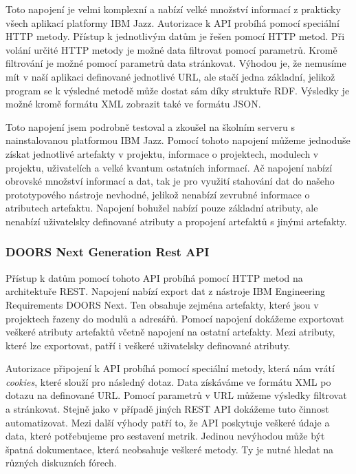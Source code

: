 \documentclass[czech,master,public,dept460,male,cpdeclaration,oneside]{diploma}
\begin{document}
Toto napojení je velmi komplexní a nabízí velké množství informací z prakticky všech aplikací platformy IBM Jazz. Autorizace k API probíhá pomocí speciální HTTP metody. Přístup k jednotlivým datům je řešen pomocí HTTP metod. Při volání určité HTTP metody je možné data filtrovat pomocí parametrů. Kromě filtrování je možné pomocí parametrů data stránkovat. Výhodou je, že nemusíme mít v naší aplikaci definované jednotlivé URL, ale stačí jedna základní, jelikož program se k výsledné metodě může dostat sám díky struktuře RDF. Výsledky je možné kromě formátu XML zobrazit také ve formátu JSON.

Toto napojení jsem podrobně testoval a zkoušel na školním serveru s nainstalovanou platformou IBM Jazz. Pomocí tohoto napojení můžeme jednoduše získat jednotlivé artefakty v projektu, informace o projektech, modulech v projektu, uživatelích a velké kvantum ostatních informací. Ač napojení nabízí obrovské množství informací a dat, tak je pro využití stahování dat do našeho prototypového nástroje nevhodné, jelikož nenabízí zevrubné informace o atributech artefaktu. Napojení bohužel nabízí pouze základní atributy, ale nenabízí uživatelsky definované atributy a propojení artefaktů s jinými artefakty.

\subsubsection{DOORS Next Generation Rest API}
Přístup k datům pomocí tohoto API probíhá pomocí HTTP metod na architektuře REST. Napojení nabízí export dat z nástroje IBM Engineering Requirements DOORS Next. Ten obsahuje zejména artefakty, které jsou v projektech řazeny do modulů a adresářů. Pomocí napojení dokážeme exportovat veškeré atributy artefaktů včetně napojení na ostatní artefakty. Mezi atributy, které lze exportovat, patří i veškeré uživatelsky definované atributy.

Autorizace připojení k API probíhá pomocí speciální metody, která nám vrátí \textit{cookies}, které slouží pro následný dotaz. Data získáváme ve formátu XML po dotazu na definované URL. Pomocí parametrů v URL můžeme výsledky filtrovat a stránkovat. Stejně jako v případě jiných REST API dokážeme tuto činnost automatizovat. Mezi další výhody patří to, že API poskytuje veškeré údaje a data, které potřebujeme pro sestavení metrik. Jedinou nevýhodou může být špatná dokumentace, která neobsahuje veškeré metody. Ty je nutné hledat na různých diskuzních fórech.
\end{document}
